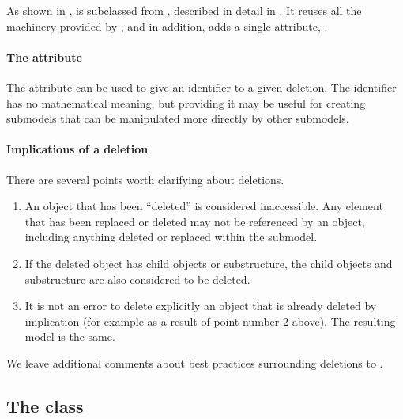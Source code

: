 As shown in , \Deletion is subclassed from \SBaseRef,
described in detail in .  It reuses all the
machinery provided by \SBaseRef, and in addition, adds a single
attribute, .


\paragraph{The \hspace*{1pt} attribute}

The \Deletion attribute  can be used to give an identifier to
a given deletion.  The identifier has no mathematical meaning, but
providing it may be useful for creating submodels that can be
manipulated more directly by other submodels.


\paragraph{Implications of a deletion}

There are several points worth clarifying about deletions.

\begin{enumerate}

\item An object that has been ``deleted'' is considered inaccessible.
  Any element that has been replaced or deleted may not be referenced by
  an \SBaseRef object, including anything deleted or replaced within the
  submodel.

\item If the deleted object has child objects or substructure, the child
  objects and substructure are also considered to be deleted.

\item It is not an error to delete explicitly an object that is already
  deleted by implication (for example as a result of point number 2
  above).  The resulting model is the same.

\end{enumerate}

We leave additional comments about best practices surrounding deletions
to .


\subsection{The  class}
\label{sbaseref-class}


